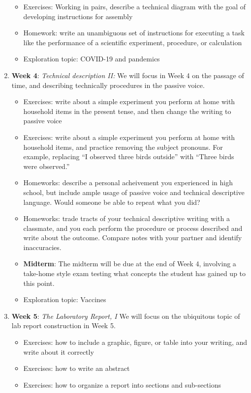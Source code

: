 \documentclass[10pt]{article}
\begin{document}
\begin{enumerate}
\begin{itemize}
\item Exercises: Working in pairs, describe a technical diagram with the goal of developing instructions for assembly
\item Homework: write an unambiguous set of instructions for executing a task like the performance of a scientific experiment, procedure, or calculation
\item Exploration topic: COVID-19 and pandemics
\end{itemize}
\item \textbf{Week 4}: \textit{Technical description II:} We will focus in Week 4 on the passage of time, and describing technically procedures in the passive voice.
\begin{itemize}
\item Exercises: write about a simple experiment you perform at home with household items in the present tense, and then change the writing to passive voice
\item Exercises: write about a simple experiment you perform at home with household items, and practice removing the subject pronouns.  For example, replacing ``I observed three birds outside'' with ``Three birds were observed.''
\item Homeworks: describe a personal acheivement you experienced in high school, but include ample usage of passive voice and technical descriptive language.  Would someone be able to repeat what you did?
\item Homeworks: trade tracts of your technical descriptive writing with a classmate, and you each perform the procedure or process described and write about the outcome.  Compare notes with your partner and identify inaccuracies.
\item \textbf{Midterm}: The midterm will be due at the end of Week 4, involving a take-home style exam testing what concepts the student has gained up to this point.
\item Exploration topic: Vaccines
\end{itemize}
\item \textbf{Week 5}: \textit{The Laboratory Report, I} We will focus on the ubiquitous topic of lab report construction in Week 5.
\begin{itemize}
\item Exercises: how to include a graphic, figure, or table into your writing, and write about it correctly
\item Exercises: how to write an abstract
\item Exercises: how to organize a report into sections and sub-sections

\end{itemize}
\end{enumerate}
\end{document}
